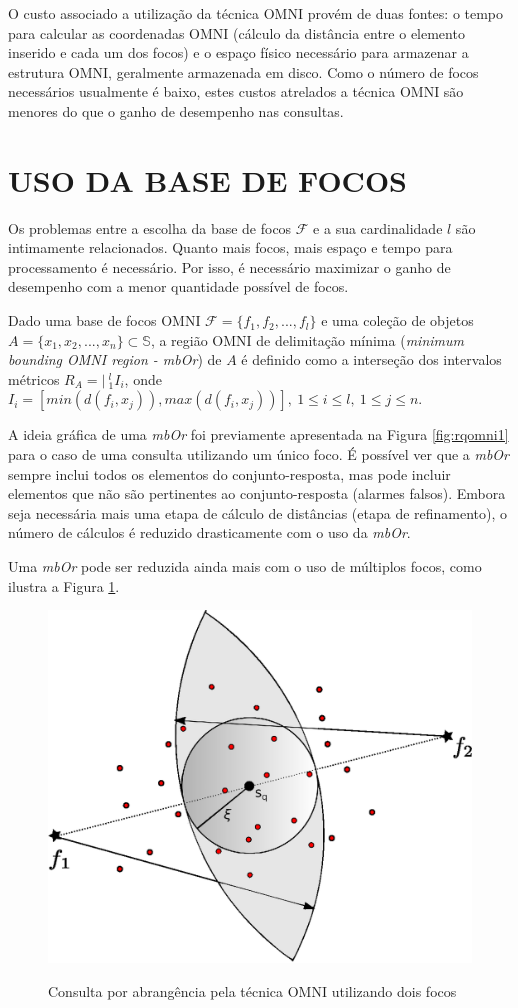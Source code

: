 O custo associado a utilização da técnica OMNI provém de duas fontes: o tempo para calcular as coordenadas OMNI (cálculo da distância
entre o elemento inserido e cada um dos focos) e o espaço físico necessário para armazenar a estrutura OMNI, geralmente armazenada em disco.
Como o número de focos necessários usualmente é baixo, estes custos atrelados a técnica OMNI são menores do que o ganho
de desempenho nas consultas.

\section{USO DA BASE DE FOCOS}
Os problemas entre a escolha da base de focos $\mathscr{F}$ e a sua cardinalidade $l$ são intimamente relacionados. Quanto
mais focos, mais espaço e tempo para processamento é necessário. Por isso, é necessário maximizar o ganho de desempenho com
a menor quantidade possível de focos.

\begin{mydef}
 Dado uma base de focos OMNI $\mathscr{F} = \{f_1, f_2, ..., f_l\}$ e uma coleção de objetos $A = \{x_1,x_2,...,x_n\} \subset \mathbb{S}$, a
 região OMNI de delimitação mínima (\textit{minimum bounding OMNI region - mbOr}) de $A$ é definido como a interseção
 dos intervalos métricos $R_A = |\  ^{l}_{1}I_i$, onde $I_i = [min(d(f_i,x_j)), max(d(f_i,x_j))],\ 1\leq i \leq l,\ 1 \leq j \leq n$. 
\end{mydef}

A ideia gráfica de uma \textit{mbOr} foi previamente apresentada na Figura \ref{fig:rqomni1} para o caso de uma consulta utilizando um único foco.
É possível ver que a \textit{mbOr} sempre inclui todos os elementos do conjunto-resposta, mas pode incluir elementos que não são pertinentes
ao conjunto-resposta (alarmes falsos). Embora seja necessária mais uma etapa de cálculo de distâncias (etapa de refinamento), o número de cálculos é
reduzido drasticamente com o uso da \textit{mbOr}.\par

Uma \textit{mbOr} pode ser reduzida ainda mais com o uso de múltiplos focos, como ilustra a Figura \ref{fig:rqomni2}.

\begin{figure}[H]
\centering
\caption{Consulta por abrangência pela técnica OMNI utilizando dois focos}
\includegraphics[width=.6\textwidth]{dados/figuras/rg_omni_2.eps}
\label{fig:rqomni2}
\end{figure}
								
